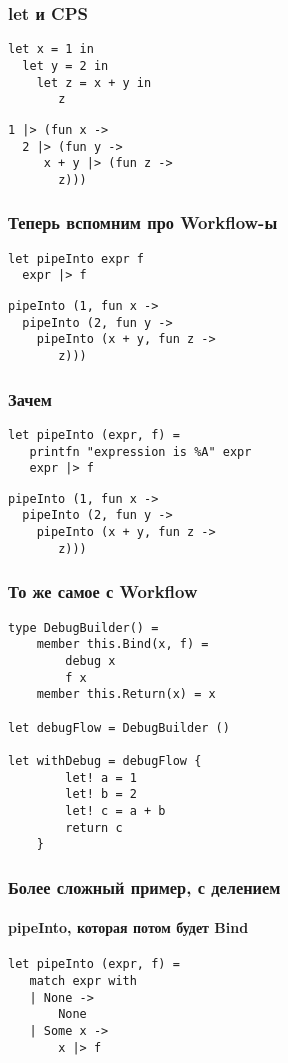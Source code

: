 \documentclass[xetex,mathserif,serif]{beamer}
\begin{document}
	\begin{frame}[fragile]
		\frametitle{let и CPS}
		\begin{verbatim}
let x = 1 in
  let y = 2 in
    let z = x + y in
       z
		\end{verbatim}
		\vspace{5mm}
		\begin{verbatim}
1 |> (fun x ->
  2 |> (fun y -> 
     x + y |> (fun z -> 
       z)))
		\end{verbatim}
\end{frame}

	\begin{frame}[fragile]
		\frametitle{Теперь вспомним про Workflow-ы}
		\begin{verbatim}
let pipeInto expr f
  expr |> f
		\end{verbatim}
		\vspace{3mm}
		\begin{verbatim}
pipeInto (1, fun x ->
  pipeInto (2, fun y -> 
    pipeInto (x + y, fun z -> 
       z)))
		\end{verbatim}
\end{frame}

	\begin{frame}[fragile]
		\frametitle{Зачем}
		\begin{verbatim}
let pipeInto (expr, f) =
   printfn "expression is %A" expr 
   expr |> f 
		\end{verbatim}
		\vspace{3mm}
		\begin{verbatim}
pipeInto (1, fun x ->
  pipeInto (2, fun y -> 
    pipeInto (x + y, fun z -> 
       z)))
		\end{verbatim}
\end{frame}

	\begin{frame}[fragile]
		\frametitle{То же самое с Workflow}
		\begin{verbatim}
type DebugBuilder() =
    member this.Bind(x, f) = 
        debug x 
        f x
    member this.Return(x) = x

let debugFlow = DebugBuilder ()

let withDebug = debugFlow {
        let! a = 1
        let! b = 2
        let! c = a + b
        return c
    }
		\end{verbatim}
\end{frame}

	\begin{frame}[fragile]
		\frametitle{Более сложный пример, с делением}
		\framesubtitle{pipeInto, которая потом будет Bind}
		\begin{verbatim}
let pipeInto (expr, f) =
   match expr with
   | None -> 
       None
   | Some x -> 
       x |> f
		\end{verbatim}
\end{frame}
\end{document}
